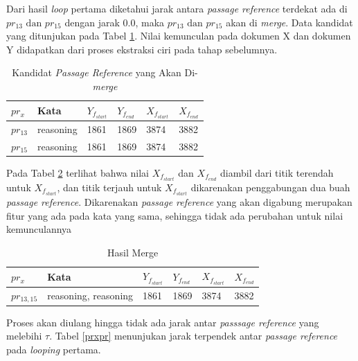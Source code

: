 \documentclass[../Book.tex]{subfiles}
\begin{document}
	\noindent Dari hasil \textit{loop} pertama diketahui jarak antara \textit{passage reference} terdekat ada di $pr_{13} \text{ dan } pr_{15}$ dengan jarak $0.0$, maka $pr_{13} \text{ dan } pr_{15}$ akan di \textit{merge}. Data kandidat yang ditunjukan pada Tabel \ref{kandidat-merge}. Nilai kemunculan pada dokumen X dan dokumen Y didapatkan dari proses ekstraksi ciri pada tahap sebelumnya.
	
	\begin{table}[H]
		\centering
		\caption{Kandidat \textit{Passage Reference} yang Akan Di-\textit{merge}}
		\label{kandidat-merge}
		\begin{tabular}{@{}llllll@{}}
			\toprule
			$pr_{x}$  & Kata   & $Y_{f_{start}}$ & $Y_{f_{end}}$ & $X_{f_{start}}$ & $X_{f_{end}}$ \\ \midrule
			$pr_{13}$ & reasoning & 1861     & 1869   & 3874     & 3882  \\
			$pr_{15}$ & reasoning & 1861     & 1869   & 3874     & 3882   \\ \bottomrule
		\end{tabular}
	\end{table}

	\noindent Pada Tabel \ref{hasil-merge} terlihat bahwa nilai $X_{f_{start}}$ dan $X_{f_{end}}$ diambil dari titik terendah untuk $X_{f_{start}}$, dan titik terjauh untuk $X_{f_{start}}$ dikarenakan penggabungan dua buah \textit{passage reference}. Dikarenakan \textit{passage reference} yang akan digabung merupakan fitur yang ada pada kata yang sama, sehingga tidak ada perubahan untuk nilai kemunculannya
	
	\begin{table}[H]
		\centering
		\caption{Hasil Merge}
		\label{hasil-merge}
		\begin{tabular}{@{}llllll@{}}
			\toprule
			$pr_{x}$  & Kata   & $Y_{f_{start}}$ & $Y_{f_{end}}$ & $X_{f_{start}}$ & $X_{f_{end}}$ \\ \midrule
			$pr_{13,15}$ & reasoning, reasoning & 1861     & 1869   & 3874     & 3882   \\ \bottomrule
		\end{tabular}
	\end{table}

	\noindent Proses akan diulang hingga tidak ada jarak antar \textit{passsage reference} yang melebihi $\tau$. Tabel \ref{prxpr} menunjukan jarak terpendek antar \textit{passage reference} pada \textit{looping} pertama. 
\end{document}
